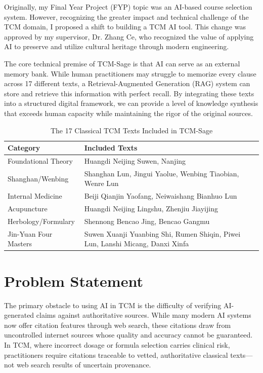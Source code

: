 \documentclass[11pt,a4paper]{report}
\begin{document}
Originally, my Final Year Project (FYP) topic was an AI-based course selection system. However, recognizing the greater impact and technical challenge of the TCM domain, I proposed a shift to building a TCM AI tool. This change was approved by my supervisor, Dr. Zhang Ce, who recognized the value of applying AI to preserve and utilize cultural heritage through modern engineering.

The core technical premise of TCM-Sage is that AI can serve as an external memory bank. While human practitioners may struggle to memorize every clause across 17 different texts, a Retrieval-Augmented Generation (RAG) system can store and retrieve this information with perfect recall. By integrating these texts into a structured digital framework, we can provide a level of knowledge synthesis that exceeds human capacity while maintaining the rigor of the original sources.

\begin{table}[H]
\centering
\caption{The 17 Classical TCM Texts Included in TCM-Sage}
\begin{tabularx}{\textwidth}{lX}
\toprule
\textbf{Category} & \textbf{Included Texts} \\
\midrule
Foundational Theory & Huangdi Neijing Suwen, Nanjing \\
Shanghan/Wenbing & Shanghan Lun, Jingui Yaolue, Wenbing Tiaobian, Wenre Lun \\
Internal Medicine & Beiji Qianjin Yaofang, Neiwaishang Bianhuo Lun \\
Acupuncture & Huangdi Neijing Lingshu, Zhenjiu Jiayijing \\
Herbology/Formulary & Shennong Bencao Jing, Bencao Gangmu \\
Jin-Yuan Four Masters & Suwen Xuanji Yuanbing Shi, Rumen Shiqin, Piwei Lun, Lanshi Micang, Danxi Xinfa \\
\bottomrule
\end{tabularx}
\label{tab:texts}
\end{table}

\section{Problem Statement}
The primary obstacle to using AI in TCM is the difficulty of verifying AI-generated claims against authoritative sources. While many modern AI systems now offer citation features through web search, these citations draw from uncontrolled internet sources whose quality and accuracy cannot be guaranteed. In TCM, where incorrect dosage or formula selection carries clinical risk, practitioners require citations traceable to vetted, authoritative classical texts---not web search results of uncertain provenance.
\end{document}
